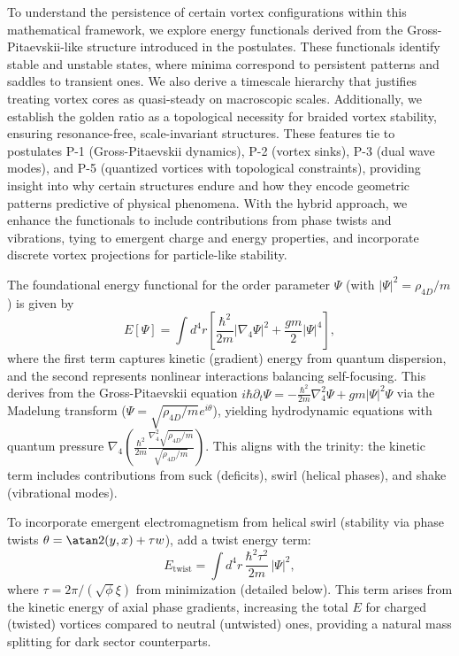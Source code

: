 To understand the persistence of certain vortex configurations within this mathematical framework, we explore energy functionals derived from the Gross-Pitaevskii-like structure introduced in the postulates. These functionals identify stable and unstable states, where minima correspond to persistent patterns and saddles to transient ones. We also derive a timescale hierarchy that justifies treating vortex cores as quasi-steady on macroscopic scales. Additionally, we establish the golden ratio as a topological necessity for braided vortex stability, ensuring resonance-free, scale-invariant structures. These features tie to postulates P-1 (Gross-Pitaevskii dynamics), P-2 (vortex sinks), P-3 (dual wave modes), and P-5 (quantized vortices with topological constraints), providing insight into why certain structures endure and how they encode geometric patterns predictive of physical phenomena. With the hybrid approach, we enhance the functionals to include contributions from phase twists and vibrations, tying to emergent charge and energy properties, and incorporate discrete vortex projections for particle-like stability.

The foundational energy functional for the order parameter $\Psi$ (with $|\Psi|^2 = \rho_{4D}/m$) is given by
\begin{equation}
E[\Psi] = \int d^4 r \left[ \frac{\hbar^2}{2m} |\nabla_4 \Psi|^2 + \frac{g m}{2} |\Psi|^4 \right],
\end{equation}
where the first term captures kinetic (gradient) energy from quantum dispersion, and the second represents nonlinear interactions balancing self-focusing. This derives from the Gross-Pitaevskii equation $i \hbar \partial_t \Psi = -\frac{\hbar^2}{2 m} \nabla_4^2 \Psi + g m |\Psi|^2 \Psi$ via the Madelung transform ($\Psi = \sqrt{\rho_{4D}/m} e^{i \theta}$), yielding hydrodynamic equations with quantum pressure $\nabla_4 \left( \frac{\hbar^2}{2 m} \frac{\nabla_4^2 \sqrt{\rho_{4D}/m}}{\sqrt{\rho_{4D}/m}} \right)$. This aligns with the trinity: the kinetic term includes contributions from suck (deficits), swirl (helical phases), and shake (vibrational modes).

To incorporate emergent electromagnetism from helical swirl (stability via phase twists $\theta = \atan2(y, x) + \tau w$), add a twist energy term:
\begin{equation}
E_{\text{twist}} = \int d^4 r \, \frac{\hbar^2 \tau^2}{2m} \, |\Psi|^2,
\end{equation}
where $\tau = 2\pi / (\sqrt{\phi} \xi)$ from minimization (detailed below). This term arises from the kinetic energy of axial phase gradients, increasing the total $E$ for charged (twisted) vortices compared to neutral (untwisted) ones, providing a natural mass splitting for dark sector counterparts.

